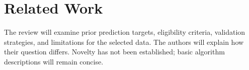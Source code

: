 \section{Related Work}
The review will examine prior prediction targets, eligibility criteria,
validation strategies, and limitations for the selected data. The authors
will explain how their question differs. Novelty has not been established;
basic algorithm descriptions will remain concise.
